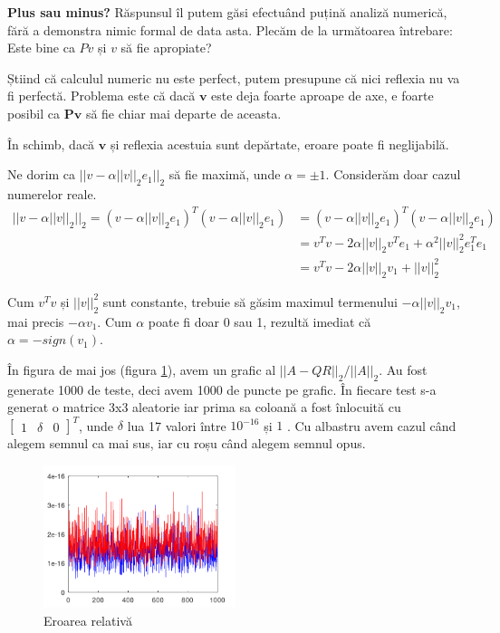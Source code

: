\documentclass{exam}
\begin{document}
\textbf{Plus sau minus?} Răspunsul îl putem găsi efectuând puțină analiză
numerică, fără a demonstra nimic formal de data asta. Plecăm de la următoarea
întrebare: Este bine ca $Pv$ și $v$ să fie apropiate?

Știind că calculul numeric nu este perfect, putem presupune că nici
reflexia nu va fi perfectă. Problema este că dacă $\mathbf{v}$ este deja foarte
aproape de axe, e foarte posibil ca $\mathbf{Pv}$ să fie chiar mai departe de
aceasta.

În schimb, dacă $\mathbf{v}$ și reflexia acestuia sunt depărtate,
eroare poate fi neglijabilă.

Ne dorim ca $||v - \alpha ||v||_2 e_1||_2$ să fie maximă, unde
$\alpha = \pm 1$. Considerăm doar cazul numerelor reale.
\begin{align*}
	||v - \alpha ||v||_2||_2 = (v - \alpha ||v||_2 e_1)^T (v - \alpha ||v||_2 e_1) & = (v - \alpha ||v||_2 e_1)^T(v - \alpha ||v||_2 e_1)           \\
	                                                                               & = v^Tv - 2 \alpha ||v||_2 v^Te_1 + \alpha^2 ||v||_2^2 e_1^Te_1 \\
	                                                                               & = v^Tv - 2 \alpha ||v||_2 v_1 + ||v||_2^2
\end{align*}

Cum $v^Tv$ și $||v||_2^2$ sunt constante, trebuie să găsim maximul
termenului $- \alpha ||v||_2 v_1$, mai precis $- \alpha v_1$. Cum $\alpha$ poate fi
doar 0 sau 1, rezultă imediat că $\alpha = -sign(v_1)$.

\newpage
În figura de mai jos (figura \ref{fig:5}), avem un grafic al
$||A - QR||_2 / ||A||_2$. Au fost generate 1000 de teste, deci avem 1000 de puncte pe
grafic. În fiecare test s-a generat o matrice 3x3 aleatorie iar prima sa coloană
a fost înlocuită cu $\begin{bmatrix} 1 & \delta & 0 \end{bmatrix}^T$, unde
$\delta$ lua 17 valori între $10^{-16}$ și $1$ \cite{overton2023}. Cu albastru
avem cazul când alegem semnul ca mai sus, iar cu roșu când alegem semnul opus.

\begin{figure}[ht]
	\centering
	\includegraphics[width=0.5\textwidth]{hbad}
	\caption{Eroarea relativă}
	\label{fig:5}
\end{figure}
\end{document}
